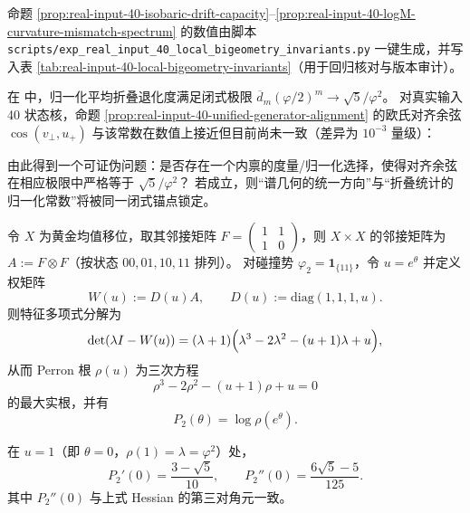 \begin{remark}\label{rem:real-input-40-local-bigeometry-script}
命题 \ref{prop:real-input-40-isobaric-drift-capacity}--\ref{prop:real-input-40-logM-curvature-mismatch-spectrum} 的数值由脚本 \texttt{scripts/exp\_real\_input\_40\_local\_bigeometry\_invariants.py} 一键生成，并写入表 \ref{tab:real-input-40-local-bigeometry-invariants}（用于回归核对与版本审计）。
\end{remark}


\begin{remark}\label{rem:alignment-cos-vs-sqrt5-phi2}
在 \cite{Internal2025ResolutionFoldingPhiPiE} 中，归一化平均折叠退化度满足闭式极限
\(
\overline d_m(\varphi/2)^m\to \sqrt5/\varphi^2
\)。
对真实输入 40 状态核，命题 \ref{prop:real-input-40-unified-generator-alignment} 的欧氏对齐余弦
\(\cos(v_\perp,u_+)\) 与该常数在数值上接近但目前尚未一致（差异为 \(10^{-3}\) 量级）：

由此得到一个可证伪问题：是否存在一个内禀的度量/归一化选择，使得对齐余弦在相应极限中严格等于 \(\sqrt5/\varphi^2\)？
若成立，则“谱几何的统一方向”与“折叠统计的归一化常数”将被同一闭式锚点锁定。
\end{remark}

\begin{proposition}[碰撞势的三次压力方程]\label{prop:real-input-40-collision-pressure}
令 $X$ 为黄金均值移位，取其邻接矩阵
\(
F=\begin{pmatrix}1&1\\[2pt]1&0\end{pmatrix}
\)，则 $X\times X$ 的邻接矩阵为 $A:=F\otimes F$（按状态 $00,01,10,11$ 排列）。
对碰撞势 $\varphi_2=\mathbf{1}_{\{11\}}$，令 $u=e^\theta$ 并定义权矩阵
\[
W(u):=D(u)A,\qquad D(u):=\mathrm{diag}(1,1,1,u).
\]
则特征多项式分解为
\[
\det(\lambda I-W(u))=(\lambda+1)\Bigl(\lambda^3-2\lambda^2-(u+1)\lambda+u\Bigr),
\]
从而 Perron 根 $\rho(u)$ 为三次方程
\[
\rho^3-2\rho^2-(u+1)\rho+u=0
\]
的最大实根，并有
\[
P_2(\theta)=\log\rho(e^\theta).
\]
\end{proposition}

\begin{corollary}\label{cor:real-input-40-collision-cumulants}
在 $u=1$（即 $\theta=0$，$\rho(1)=\lambda=\varphi^2$）处，
\[
P_2'(0)=\frac{3-\sqrt5}{10},
\qquad
P_2''(0)=\frac{6\sqrt5-5}{125}.
\]
其中 $P_2''(0)$ 与上式 Hessian 的第三对角元一致。
\end{corollary}

